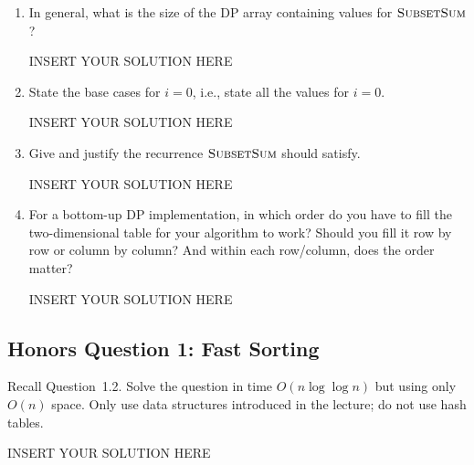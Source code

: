 \begin{enumerate}
    
    \item In general, what is the size of the DP array containing values for $\textsc{SubsetSum}$? 
\begin{solution}   INSERT YOUR SOLUTION HERE   \end{solution}
    
    \item State the base cases for $i=0$, i.e., state all the values for $i=0$.
\begin{solution}   INSERT YOUR SOLUTION HERE   \end{solution}

    \item Give and justify the recurrence $\textsc{SubsetSum}$ should satisfy. 
\begin{solution}   INSERT YOUR SOLUTION HERE   \end{solution}
    
    \item For a bottom-up DP implementation, in which order do you have to fill the two-dimensional table for your algorithm to work? Should you fill it row by row or column by column? And within each row/column, does the order matter? 
\begin{solution}   INSERT YOUR SOLUTION HERE   \end{solution}
\end{enumerate}


\subsection*{Honors Question 1: Fast Sorting}

Recall Question~1.2. Solve the question in time $O(n \log\!\log n)$ but using only $O(n)$ space. Only use data structures introduced in the lecture; do not use hash tables. 

\begin{solution}   INSERT YOUR SOLUTION HERE   \end{solution}



